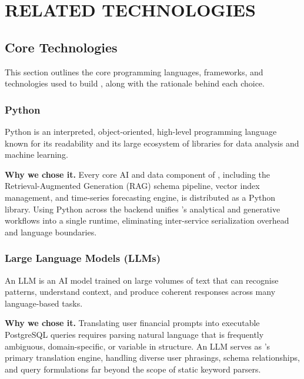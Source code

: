 %
\section{RELATED TECHNOLOGIES}
\label{sec:related-technologies}

\subsection{Core Technologies}
\label{sub:core-technologies}
This section outlines the core programming languages, frameworks, and technologies used to build \projname{}, along with the rationale behind each choice.

\subsubsection{Python}
Python is an interpreted, object-oriented, high-level programming
language known for its readability and its large ecosystem of libraries
for data analysis and machine learning.

\noindent \textbf{Why we chose it.} Every core AI and data component of
\projname{}, including the Retrieval-Augmented Generation (RAG) schema
pipeline, vector index management, and time-series forecasting engine, is
distributed as a Python library. Using Python across the backend unifies
\projname{}'s analytical and generative workflows into a single runtime,
eliminating inter-service serialization overhead and language boundaries.

\subsubsection{Large Language Models (LLMs)}
An LLM is an AI model trained on large volumes of text that can
recognise patterns, understand context, and produce coherent responses
across many language-based tasks.

\noindent \textbf{Why we chose it.} Translating user financial prompts into
executable PostgreSQL queries requires parsing natural language that is
frequently ambiguous, domain-specific, or variable in structure. An LLM
serves as \projname{}'s primary translation engine, handling diverse user
phrasings, schema relationships, and query formulations far beyond the
scope of static keyword parsers.

